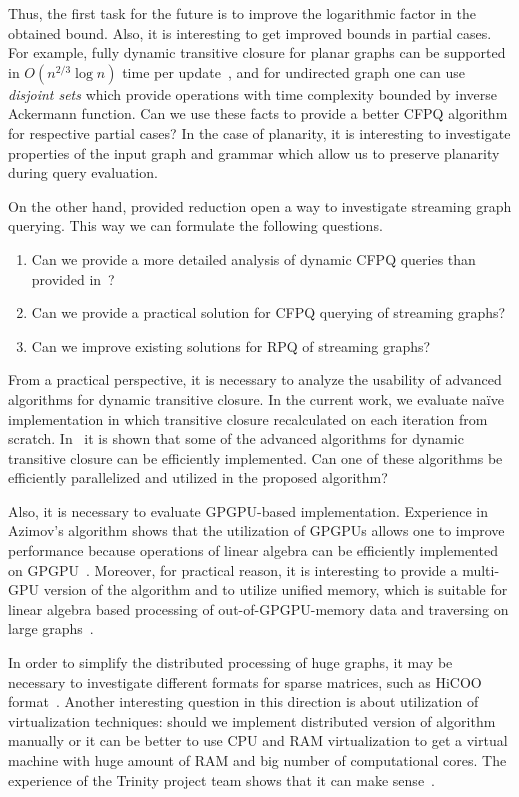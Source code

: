 Thus, the first task for the future is to improve the logarithmic factor in the obtained bound.
Also, it is interesting to get improved bounds in partial cases.
For example, fully dynamic transitive closure for planar graphs can be supported in $O(n^{2/3}\log{n})$ time per update~\cite{10.1007/3-540-57273-2_72}, and for undirected graph one can use \textit{disjoint sets} which provide operations with time complexity bounded by inverse Ackermann function.
Can we use these facts to provide a better CFPQ algorithm for respective partial cases? 
In the case of planarity, it is interesting to investigate properties of the input graph and grammar which allow us to preserve planarity during query evaluation.

On the other hand, provided reduction open a way to investigate streaming graph querying.
This way we can formulate the following questions.
\begin{enumerate}
\item Can we provide a more detailed analysis of dynamic CFPQ queries than provided in~\cite{10.1007/978-3-662-54458-7_16}?
\item Can we provide a practical solution for CFPQ querying of streaming graphs?
\item Can we improve existing solutions for RPQ of streaming graphs?
\end{enumerate}

From a practical perspective, it is necessary to analyze the usability of advanced algorithms for dynamic transitive closure.
In the current work, we evaluate na{\"i}ve implementation in which transitive closure recalculated on each iteration from scratch.
In~\cite{cs6345} it is shown that some of the advanced algorithms for dynamic transitive closure can be efficiently implemented.
Can one of these algorithms be efficiently parallelized and utilized in the proposed algorithm?

Also, it is necessary to evaluate GPGPU-based implementation.
Experience in Azimov's algorithm shows that the utilization of GPGPUs allows one to improve performance because operations of linear algebra can be efficiently implemented on GPGPU~\cite{Mishin:2019:ECP:3327964.3328503,10.1145/3398682.3399163}. 
Moreover, for practical reason, it is interesting to provide a multi-GPU version of the algorithm and to utilize unified memory, which is suitable for linear algebra based processing of out-of-GPGPU-memory data and traversing on large graphs~\cite{8946118,10.14778/3384345.3384358}.

In order to simplify the distributed processing of huge graphs, it may be necessary to investigate different formats for sparse matrices, such as HiCOO format~\cite{10.5555/3291656.3291682}. 
Another interesting question in this direction is about utilization of virtualization techniques: should we implement distributed version of algorithm manually or it can be better to use CPU and RAM virtualization to get a virtual machine with huge amount of RAM and big number of computational cores. 
The experience of the Trinity project team shows that it can make sense~\cite{10.1145/2463676.2467799}. 

